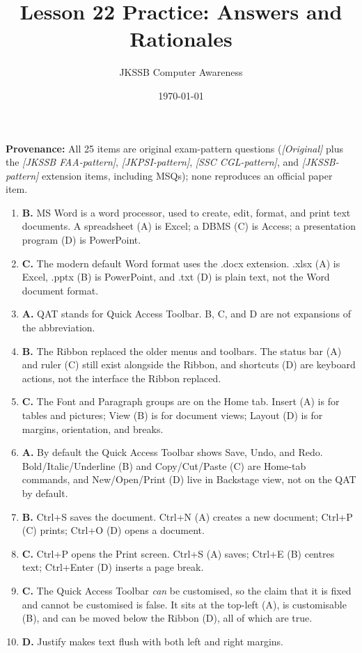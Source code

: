\documentclass[11pt]{article}
\title{Lesson 22 Practice: Answers and Rationales}
\author{JKSSB Computer Awareness}
\date{\today}
\begin{document}
\maketitle
\noindent\textbf{Provenance:} All 25 items are original exam-pattern questions (\textit{[Original]} plus the \textit{[JKSSB FAA-pattern]}, \textit{[JKPSI-pattern]}, \textit{[SSC CGL-pattern]}, and \textit{[JKSSB-pattern]} extension items, including MSQs); none reproduces an official paper item.
\begin{enumerate}[label=\textbf{Q\arabic*.}, leftmargin=*]
\item \textbf{B.} MS Word is a word processor, used to create, edit, format,
  and print text documents. A spreadsheet (A) is Excel; a DBMS (C) is Access;
  a presentation program (D) is PowerPoint.
\item \textbf{C.} The modern default Word format uses the .docx extension.
  .xlsx (A) is Excel, .pptx (B) is PowerPoint, and .txt (D) is plain text,
  not the Word document format.
\item \textbf{A.} QAT stands for Quick Access Toolbar. B, C, and D are not
  expansions of the abbreviation.
\item \textbf{B.} The Ribbon replaced the older menus and toolbars. The
  status bar (A) and ruler (C) still exist alongside the Ribbon, and
  shortcuts (D) are keyboard actions, not the interface the Ribbon replaced.
\item \textbf{C.} The Font and Paragraph groups are on the Home tab. Insert
  (A) is for tables and pictures; View (B) is for document views; Layout (D)
  is for margins, orientation, and breaks.
\item \textbf{A.} By default the Quick Access Toolbar shows Save, Undo, and
  Redo. Bold/Italic/Underline (B) and Copy/Cut/Paste (C) are Home-tab
  commands, and New/Open/Print (D) live in Backstage view, not on the QAT by
  default.
\item \textbf{B.} Ctrl+S saves the document. Ctrl+N (A) creates a new
  document; Ctrl+P (C) prints; Ctrl+O (D) opens a document.
\item \textbf{C.} Ctrl+P opens the Print screen. Ctrl+S (A) saves; Ctrl+E
  (B) centres text; Ctrl+Enter (D) inserts a page break.
\item \textbf{C.} The Quick Access Toolbar \emph{can} be customised, so the
  claim that it is fixed and cannot be customised is false. It sits at the
  top-left (A), is customisable (B), and can be moved below the Ribbon (D),
  all of which are true.
\item \textbf{D.} Justify makes text flush with both left and right margins.

\end{enumerate}
\end{document}
